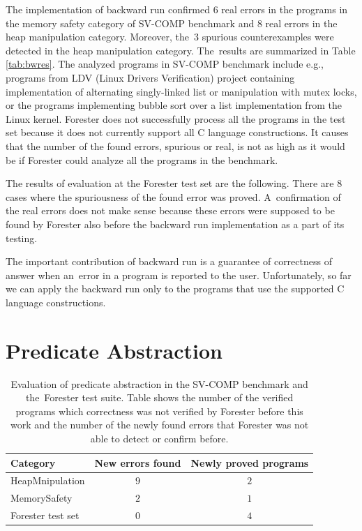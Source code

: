 The implementation of backward run confirmed $6$ real errors in the programs
in the memory safety category of SV-COMP benchmark and
$8$ real errors in the heap manipulation category.
Moreover, the~$3$ spurious counterexamples were detected in the heap manipulation category.
The~results are summarized in Table \ref{tab:bwres}.
The analyzed programs in SV-COMP benchmark include
e.g., programs from LDV (Linux Drivers Verification) project
containing implementation of alternating singly-linked list
or manipulation with mutex locks, or the programs
implementing bubble sort over a list implementation from the Linux kernel.
Forester does not successfully process all the programs in the test set
because it does not currently support all C language constructions.
It causes that the number of the found errors, spurious or real, is not as high as it would be
if Forester could analyze all the programs in the benchmark.

The results of evaluation at the Forester test set are the following.
There are $8$ cases where the spuriousness of the found error was proved.
A~confirmation of the real errors does not make sense because
these errors were supposed to be found by Forester also before
the backward run implementation as a part of its testing.

The important contribution of backward run is a guarantee
of correctness of answer when an~error in a program is reported to the user.
Unfortunately, so far we can apply the backward run
only to the programs that use the supported C language constructions.

\section{Predicate Abstraction}
\label{sec:paeval}

\begin{table}[bt]
	\vskip6pt
	\caption{Evaluation of predicate abstraction
	in the SV-COMP benchmark and the~Forester test suite.
	Table shows the number of the verified programs which correctness was not
	verified by Forester before this work and the number of the newly found errors
	that Forester was not able to detect or confirm before.
	}
	\centering
	\begin{tabular}{| l | c | c |}
		\hline
		Category & New errors found & Newly proved programs  \\
		\hline
		\hline
		HeapMnipulation & $9$ & $2$ \\
		\hline
		MemorySafety & $2$ & $1$ \\
		\hline
		Forester test set & $0$ & $4$  \\
		\hline
	\end{tabular}
	\label{tab:pares}
\end{table}


